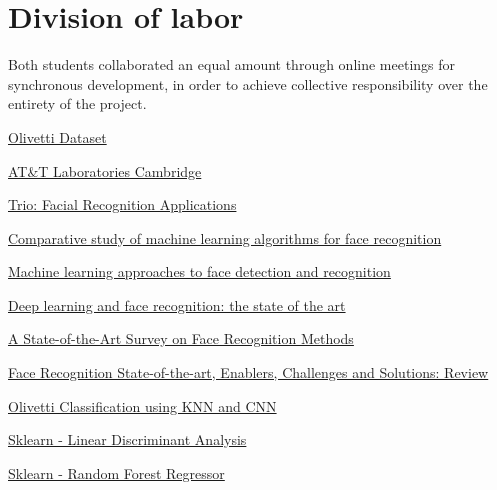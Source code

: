 \documentclass[conference]{IEEEtran}
\begin{document}
\section{Division of labor}
Both students collaborated an equal amount through online meetings for synchronous development, in order to achieve collective responsibility over the entirety of the project.

\glsaddall
\printglossary
{}


\begin{thebibliography}{00}

\href{https://www.kaggle.com/datasets/imrandude/olivetti}{Olivetti Dataset}

\href{https://cam-orl.co.uk/index.html}{AT\&T Laboratories Cambridge}

\href{https://www.trio.dev/blog/facial-recognition-applications}{Trio: Facial Recognition Applications}

\href{https://hal.inria.fr/hal-03620410/document}{Comparative study of machine learning algorithms for
face recognition}

\href{https://www.clarifai.com/hubfs/Ebooks/whitepaper-machine-learning-approaches-face-detection.pdf}{Machine learning approaches to face detection
and recognition}

\href{https://arxiv.org/pdf/1902.03524.pdf}{Deep learning and face recognition: the state of the art}

\href{https://www.igi-global.com/pdf.aspx?tid=283961&ptid=278106&ctid=4&oa=true&isxn=9781683182122}{A State-of-the-Art Survey on Face Recognition Methods}

\href{https://www.warse.org/IJATCSE/static/pdf/file/ijatcse16912sl2020.pdf}{Face Recognition State-of-the-art, Enablers, Challenges and Solutions: Review}

\href{https://www.kaggle.com/code/tareksherif/olivetti-classification-useing-knn-cnn-for-fun/notebook}{Olivetti Classification using KNN and CNN}

\href{https://scikit-learn.org/stable/modules/generated/sklearn.discriminant_analysis.LinearDiscriminantAnalysis.html}{Sklearn - Linear Discriminant Analysis}

\href{https://scikit-learn.org/stable/modules/generated/sklearn.ensemble.RandomForestRegressor.html}{Sklearn - Random Forest Regressor}


\end{thebibliography}
\end{document}
